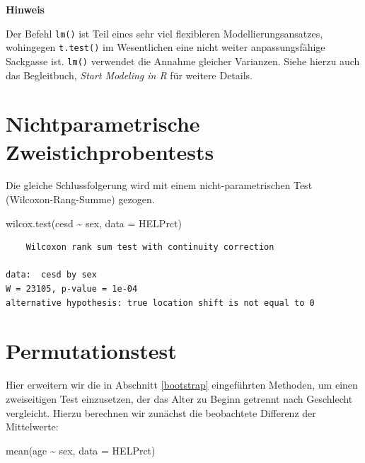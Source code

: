 \documentclass[
  ngerman,
]{scrbook}
\newenvironment{Shaded}{\begin{snugshade}}{\end{snugshade}}
\newcommand{\AttributeTok}[1]{\textcolor[rgb]{0.77,0.63,0.00}{#1}}
\newcommand{\FunctionTok}[1]{\textcolor[rgb]{0.00,0.00,0.00}{#1}}
\newcommand{\NormalTok}[1]{#1}
\newcommand{\SpecialCharTok}[1]{\textcolor[rgb]{0.00,0.00,0.00}{#1}}
\newenvironment{hinweis}[1]
  {
  \begin{itemize}
  \renewcommand{\labelitemi}{
    \raisebox{1.8\height}[0pt][0pt]{
      {\setkeys{Gin}{width=7em,keepaspectratio}
        {\Large \textcolor{dark-fom-green}\faHandORight}}
        }
  }
  \begin{blackbox}
        \bgroup\color{dark-fom-green}
          {\textbf{Hinweis}}
        \egroup
  \item
  }
  {
  \end{blackbox}
  \end{itemize}
  }
\begin{document}
\begin{hinweis}{hinweis}
Der Befehl \texttt{lm()} ist Teil eines sehr viel flexibleren Modellierungsansatzes, wohingegen \texttt{t.test()} im Wesentlichen eine nicht weiter anpassungsfähige Sackgasse ist. \texttt{lm()} verwendet die Annahme gleicher Varianzen. Siehe hierzu auch das Begleitbuch, \emph{Start Modeling in R} \autocite{ModelingR} für weitere Details.

\end{hinweis}

\hypertarget{nichtparametrische-zweistichprobentests}{%
\section{Nichtparametrische Zweistichprobentests}\label{nichtparametrische-zweistichprobentests}}

Die gleiche Schlussfolgerung wird mit einem nicht-parametrischen Test (Wilcoxon-Rang-Summe) gezogen.

\begin{Shaded}
\begin{Highlighting}[]
\FunctionTok{wilcox.test}\NormalTok{(cesd }\SpecialCharTok{\textasciitilde{}}\NormalTok{ sex, }\AttributeTok{data =}\NormalTok{ HELPrct)}
\end{Highlighting}
\end{Shaded}

\begin{verbatim}
    Wilcoxon rank sum test with continuity correction

data:  cesd by sex
W = 23105, p-value = 1e-04
alternative hypothesis: true location shift is not equal to 0
\end{verbatim}

\hypertarget{permutationstest}{%
\section{Permutationstest}\label{permutationstest}}

Hier erweitern wir die in Abschnitt \ref{bootstrap} eingeführten Methoden, um einen zweiseitigen Test einzusetzen, der das Alter zu Beginn getrennt nach Geschlecht vergleicht. Hierzu berechnen wir zunächst die beobachtete Differenz der Mittelwerte:

\begin{Shaded}
\begin{Highlighting}[]
\FunctionTok{mean}\NormalTok{(age }\SpecialCharTok{\textasciitilde{}}\NormalTok{ sex, }\AttributeTok{data =}\NormalTok{ HELPrct)}
\end{Highlighting}
\end{Shaded}
\end{document}
